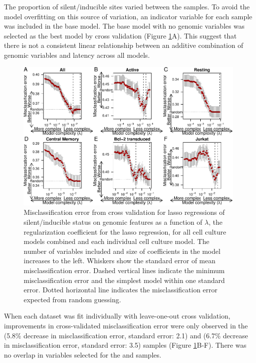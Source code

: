 \documentclass[../sherrill-Mix_thesis.tex]{subfiles}
\begin{document}
		The proportion of silent/inducible sites varied between the samples. To avoid the model overfitting on this source of variation, an indicator variable for each sample was included in the base model. The base model with no genomic variables was selected as the best model by cross validation (Figure \ref{figIndivFit}A). This suggest that there is not a consistent linear relationship between an additive combination of genomic variables and latency across all models.

		\begin{figure}
			\centering
				\includegraphics[width=1\textwidth]{individualFits.pdf} %
			\caption[Lasso regressions predicting latency]{Misclassification error from cross validation for lasso regressions of silent/inducible status on genomic features as a function of $\lambda$, the regularization coefficient for the lasso regression, for all cell culture models combined and each individual cell culture model. The number of variables included and size of coefficients in the model increases to the left. Whiskers show the standard error of mean misclassification error. Dashed vertical lines indicate the minimum misclassification error and the simplest model within one standard error. Dotted horizontal line indicates the misclassification error expected from random guessing.}
			\label{figIndivFit}
		\end{figure}


		When each dataset was fit individually with leave-one-out cross validation, improvements in cross-validated misclassification error were only observed in the \Active{} (5.8\% decrease in misclassification error, standard error: 2.1) and \Jurkat{} (6.7\% decrease in misclassification error, standard error: 3.5) samples (Figure \ref{figIndivFit}B-F). There was no overlap in variables selected for the \Active{} and \Jurkat{} samples. %
\end{document}
